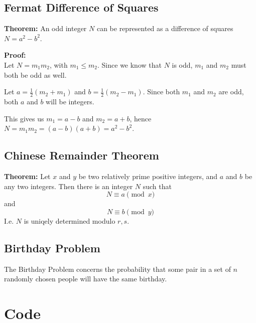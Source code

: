 \documentclass[a4paper, 12pt]{report}
\begin{document}
\section{Fermat Difference of Squares}
\label{sec:fermatproof}
\begin{description}
\item{\bf Theorem:} An odd integer $N$ can be represented as a difference of squares $N = a^2 - b^2$.


\item{\bf Proof:} \\
Let $ N = m_1m_2 $, with $ m_1 \le m_2 $. Since we know that $N$ is odd, $m_1$ and $m_2$ must both be odd as well.

Let $ a = \frac{1}{2} (m_2 + m_1) $ and $ b = \frac{1}{2} (m_2 - m_1) $. Since both $m_1$ and $m_2$ are odd, both $a$ and $b$ will be integers. 

This gives us $m_1 = a - b$ and $m_2 = a + b $, hence $N = m_1m_2 = (a - b)(a + b) = a^2 - b^2$.

\end{description}

\section{Chinese Remainder Theorem}
\label{sec:chinese}

\begin{description}
\item{\bf Theorem:} Let $x$ and $y$ be two relatively prime positive integers, and $a$ and $b$ be any two integers. Then there is an integer $N$ such that 
\begin{equation}
N \equiv a \pmod x 
\end{equation}
and
\begin{equation}
N \equiv b \pmod y
\end{equation}
I.e. $N$ is uniqely determined modulo $r,s$.

\end{description}

\section{Birthday Problem}
\label{sec:birthday}
The Birthday Problem concerns the probability that some pair in a set of $n$ randomly chosen people will have the same birthday.

\chapter{Code}
\end{document}

